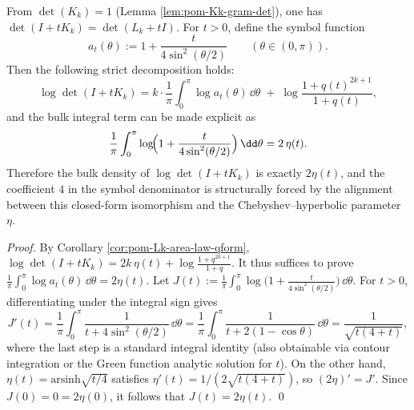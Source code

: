 \begin{proposition}[Strong Szeg\H{o}-type decomposition with integrable closed form: symbol \(a_t(\theta)=1+\frac{t}{4\sin^2(\theta/2)}\)]\label{prop:pom-Kk-strong-szego-bulk-surface}
From \(\det(K_k)=1\) (Lemma \ref{lem:pom-Kk-gram-det}), one has \(\det(I+tK_k)=\det(L_k+tI)\).
For \(t>0\), define the symbol function
\[
a_t(\theta):=1+\frac{t}{4\sin^2(\theta/2)}\qquad(\theta\in(0,\pi)).
\]
Then the following strict decomposition holds:
\[
\log\det(I+tK_k)
=k\cdot \frac{1}{\pi}\int_{0}^{\pi}\log a_t(\theta)\,\dd\theta
\;+\;\log\frac{1+q(t)^{2k+1}}{1+q(t)},
\]
and the bulk integral term can be made explicit as
\[
\frac{1}{\pi}\int_{0}^{\pi}\log\!\Bigl(1+\frac{t}{4\sin^2(\theta/2)}\Bigr)\,\dd\theta
=2\,\eta(t).
\]
Therefore the bulk density of \(\log\det(I+tK_k)\) is exactly \(2\eta(t)\), and the coefficient \(4\) in the symbol denominator is structurally forced by the alignment between this closed-form isomorphism and the Chebyshev--hyperbolic parameter \(\eta\).
\end{proposition}
\begin{proof}
By Corollary \ref{cor:pom-Lk-area-law-qform},
\(
\log\det(I+tK_k)=2k\,\eta(t)+\log\frac{1+q^{2k+1}}{1+q}
\).
It thus suffices to prove
\(
\frac{1}{\pi}\int_0^\pi \log a_t(\theta)\,\dd\theta=2\eta(t)
\).
Let
\(
J(t):=\frac{1}{\pi}\int_0^\pi \log\bigl(1+\frac{t}{4\sin^2(\theta/2)}\bigr)\,\dd\theta
\).
For \(t>0\), differentiating under the integral sign gives
\[
J'(t)=\frac{1}{\pi}\int_0^\pi \frac{1}{t+4\sin^2(\theta/2)}\,\dd\theta
=\frac{1}{\pi}\int_0^\pi \frac{1}{t+2(1-\cos\theta)}\,\dd\theta
=\frac{1}{\sqrt{t(4+t)}},
\]
where the last step is a standard integral identity (also obtainable via contour integration or the Green function analytic solution for \(t\)).
On the other hand, \(\eta(t)=\mathrm{arsinh}\sqrt{t/4}\) satisfies \(\eta'(t)=1/(2\sqrt{t(4+t)})\), so \((2\eta)'=J'\).
Since \(J(0)=0=2\eta(0)\), it follows that \(J(t)=2\eta(t)\). \qed
\end{proof}

